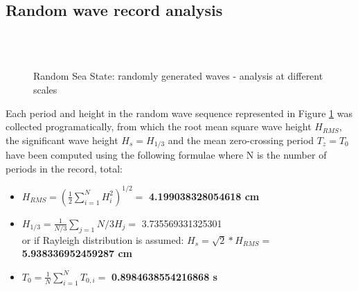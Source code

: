 \documentclass{article}
\begin{document}
	\subsection{Random wave record analysis}
	\begin{figure}[H]
		\centering
		\\
		\\
		\caption{Random Sea State: randomly generated waves - analysis at different scales}
		\label{randomgraph}
	\end{figure}
	Each period and height in the random wave sequence represented in Figure \ref{randomgraph} was collected programatically, from which the root mean square wave height $H_{RMS}$, the significant wave height $H_s = H_{1/3}$ and the mean zero-crossing period $T_z = T_0$ have been computed using the following formulae where N is the number of periods in the record, total:
	\begin{itemize}
		\item \( \displaystyle H_{RMS} = (\frac{1}{2}\sum_{i = 1}^{N}H_i^2)^{1/2} = \) \textbf{4.199038328054618 cm}
		\item \( \displaystyle H_{1/3}= \frac{1}{N/3} \sum_{j = 1}{N/3} H_j =\) 3.735569331325301\\
		or if Rayleigh distribution is assumed:  \( \displaystyle H_s= \sqrt{2} * H_{RMS} =\)\textbf{5.938336952459287 cm}
		\item \( \displaystyle T_0 = \frac{1}{N}\sum_{i = 1}^{N} T_{0,i} =\) \textbf{0.8984638554216868 s}
	\end{itemize}
\end{document}
